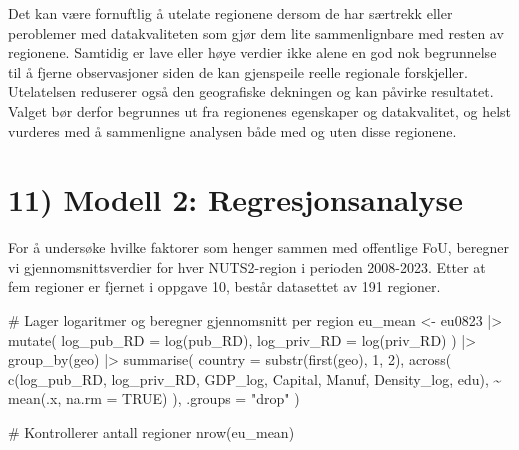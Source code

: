 \documentclass[
  letterpaper,
  DIV=11,
  numbers=noendperiod]{scrartcl}
\newenvironment{Shaded}{\begin{snugshade}}{\end{snugshade}}
\newcommand{\AttributeTok}[1]{\textcolor[rgb]{0.40,0.45,0.13}{#1}}
\newcommand{\CommentTok}[1]{\textcolor[rgb]{0.37,0.37,0.37}{#1}}
\newcommand{\ConstantTok}[1]{\textcolor[rgb]{0.56,0.35,0.01}{#1}}
\newcommand{\DecValTok}[1]{\textcolor[rgb]{0.68,0.00,0.00}{#1}}
\newcommand{\FunctionTok}[1]{\textcolor[rgb]{0.28,0.35,0.67}{#1}}
\newcommand{\NormalTok}[1]{\textcolor[rgb]{0.00,0.23,0.31}{#1}}
\newcommand{\OtherTok}[1]{\textcolor[rgb]{0.00,0.23,0.31}{#1}}
\newcommand{\SpecialCharTok}[1]{\textcolor[rgb]{0.37,0.37,0.37}{#1}}
\newcommand{\StringTok}[1]{\textcolor[rgb]{0.13,0.47,0.30}{#1}}
\begin{document}
Det kan være fornuftlig å utelate regionene dersom de har særtrekk eller
peroblemer med datakvaliteten som gjør dem lite sammenlignbare med
resten av regionene. Samtidig er lave eller høye verdier ikke alene en
god nok begrunnelse til å fjerne observasjoner siden de kan gjenspeile
reelle regionale forskjeller. Utelatelsen reduserer også den geografiske
dekningen og kan påvirke resultatet. Valget bør derfor begrunnes ut fra
regionenes egenskaper og datakvalitet, og helst vurderes med å
sammenligne analysen både med og uten disse regionene.

\section{11) Modell 2:
Regresjonsanalyse}\label{modell-2-regresjonsanalyse}

For å undersøke hvilke faktorer som henger sammen med offentlige FoU,
beregner vi gjennomsnittsverdier for hver NUTS2-region i perioden
2008-2023. Etter at fem regioner er fjernet i oppgave 10, består
datasettet av 191 regioner.

\begin{Shaded}
\begin{Highlighting}[]
\CommentTok{\# Lager logaritmer og beregner gjennomsnitt per region}
\NormalTok{eu\_mean }\OtherTok{\textless{}{-}}\NormalTok{ eu0823 }\SpecialCharTok{|\textgreater{}}
  \FunctionTok{mutate}\NormalTok{(}
    \AttributeTok{log\_pub\_RD =} \FunctionTok{log}\NormalTok{(pub\_RD),}
    \AttributeTok{log\_priv\_RD =} \FunctionTok{log}\NormalTok{(priv\_RD)}
\NormalTok{  ) }\SpecialCharTok{|\textgreater{}}
  \FunctionTok{group\_by}\NormalTok{(geo) }\SpecialCharTok{|\textgreater{}}
  \FunctionTok{summarise}\NormalTok{(}
    \AttributeTok{country =} \FunctionTok{substr}\NormalTok{(}\FunctionTok{first}\NormalTok{(geo), }\DecValTok{1}\NormalTok{, }\DecValTok{2}\NormalTok{),}
    \FunctionTok{across}\NormalTok{(}
      \FunctionTok{c}\NormalTok{(log\_pub\_RD, log\_priv\_RD,}
\NormalTok{        GDP\_log, Capital, Manuf,}
\NormalTok{        Density\_log, edu),}
      \SpecialCharTok{\textasciitilde{}} \FunctionTok{mean}\NormalTok{(.x, }\AttributeTok{na.rm =} \ConstantTok{TRUE}\NormalTok{)}
\NormalTok{    ),}
    \AttributeTok{.groups =} \StringTok{"drop"}
\NormalTok{  )}

\CommentTok{\# Kontrollerer antall regioner}
\FunctionTok{nrow}\NormalTok{(eu\_mean)}
\end{Highlighting}
\end{Shaded}
\end{document}
